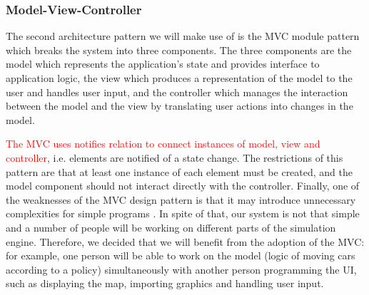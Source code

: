 \documentclass{article}
\begin{document}
	\subsubsection{Model-View-Controller}
	The second architecture pattern we will make use of is the MVC module pattern which breaks the system into three components. 
	The three components are the model which represents the application's state and provides interface to application logic, the view which produces a representation of the model to the user and handles user input, and the controller which manages the interaction between the model and the view by translating user actions into changes in the model. 
	
	\textcolor{red}{The MVC uses notifies relation to connect instances of model, view and controller}, i.e. elements are notified of a state change. 
	The restrictions of this pattern are that at least one instance of each element must be created, and the model component should not interact directly with the controller. 
	Finally, one of the weaknesses of the MVC design pattern is that it may introduce unnecessary complexities for simple programs \cite{bass2007software}. 
	In spite of that, our system is not that simple and a number of people will be working on different parts of the simulation engine. Therefore, we decided that we will benefit from the adoption of the MVC: for example, one person will be able to work on the model (logic of moving cars according to a policy) simultaneously with another person programming the UI, such as displaying the map, importing graphics and handling user input. 
	
\end{document}
